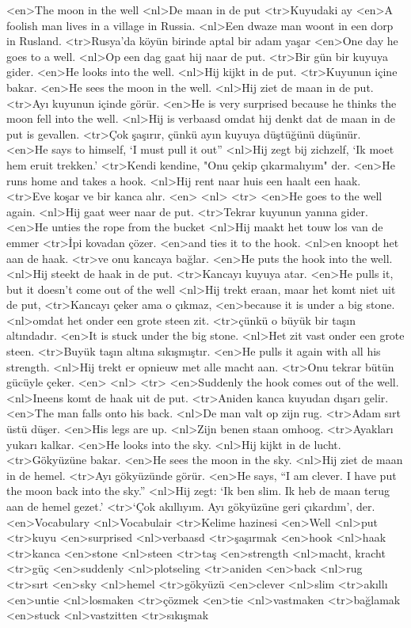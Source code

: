 <en>The moon in the well
<nl>De maan in de put
<tr>Kuyudaki ay
<en>A foolish man lives in a village in Russia.
<nl>Een dwaze man woont in een dorp in Rusland.
<tr>Rusya'da köyün birinde aptal bir adam yaşar
<en>One day he goes to a well.
<nl>Op een dag gaat hij naar de put.
<tr>Bir gün bir kuyuya gider.
<en>He looks into the well.
<nl>Hij kijkt in de put.
<tr>Kuyunun içine bakar.
<en>He sees the moon in the well.
<nl>Hij ziet de maan in de put.
<tr>Ayı kuyunun içinde görür.
<en>He is very surprised because he thinks the moon fell into the well.
<nl>Hij is verbaasd omdat hij denkt dat de maan in de put is gevallen.
<tr>Çok şaşırır, çünkü ayın kuyuya düştüğünü düşünür.
<en>He says to himself, `I must pull it out”
<nl>Hij zegt bij zichzelf, `Ik moet hem eruit trekken.'
<tr>Kendi kendine, "Onu çekip çıkarmalıyım" der.
<en>He runs home and takes a hook.
<nl>Hij rent naar huis een haalt een haak.
<tr>Eve koşar ve bir kanca alır.
<en>
<nl>
<tr>
<en>He goes to the well again.
<nl>Hij gaat weer naar de put.
<tr>Tekrar kuyunun yanına gider.
<en>He unties the rope from the bucket
<nl>Hij maakt het touw los van de emmer
<tr>İpi kovadan çözer.
<en>and ties it to the hook.
<nl>en knoopt het aan de haak. 
<tr>ve onu kancaya bağlar.
<en>He puts the hook into the well.
<nl>Hij steekt de haak in de put.
<tr>Kancayı kuyuya atar.
<en>He pulls it, but it doesn’t come out of the well
<nl>Hij trekt eraan, maar het komt niet uit de put,
<tr>Kancayı çeker ama o çıkmaz,
<en>because it is under a big stone.
<nl>omdat  het onder een grote steen zit.
<tr>çünkü o büyük bir taşın altındadır.
<en>It is stuck under the big stone.
<nl>Het zit vast onder een grote steen.
<tr>Buyük taşın altına sıkışmıştır.
<en>He pulls it again with all his strength.
<nl>Hij trekt er opnieuw met alle macht aan. 
<tr>Onu tekrar bütün gücüyle çeker.
<en>
<nl>
<tr>
<en>Suddenly the hook comes out of the well.
<nl>Ineens komt de haak uit de put.
<tr>Aniden kanca kuyudan dışarı gelir.
<en>The man falls onto his back.
<nl>De man valt op zijn rug.
<tr>Adam sırt üstü düşer.
<en>His legs are up.
<nl>Zijn benen staan omhoog. 
<tr>Ayakları yukarı kalkar.
<en>He looks into the sky.
<nl>Hij kijkt in de lucht.
<tr>Gökyüzüne bakar.
<en>He sees the moon in the sky.
<nl>Hij ziet de maan in de hemel.
<tr>Ayı gökyüzünde görür.
<en>He says, “I am clever. I have put the moon back into the sky.”
<nl>Hij zegt: `Ik ben slim. Ik heb de maan terug aan de hemel gezet.' 
<tr>`Çok akıllıyım. Ayı gökyüzüne geri çıkardım', der.
<en>Vocabulary
<nl>Vocabulair
<tr>Kelime hazinesi
<en>Well
<nl>put
<tr>kuyu
<en>surprised
<nl>verbaasd
<tr>şaşırmak
<en>hook
<nl>haak
<tr>kanca
<en>stone
<nl>steen
<tr>taş
<en>strength
<nl>macht, kracht
<tr>güç
<en>suddenly
<nl>plotseling
<tr>aniden
<en>back
<nl>rug
<tr>sırt
<en>sky
<nl>hemel
<tr>gökyüzü
<en>clever
<nl>slim
<tr>akıllı
<en>untie
<nl>losmaken
<tr>çözmek
<en>tie
<nl>vastmaken
<tr>bağlamak
<en>stuck
<nl>vastzitten
<tr>sıkışmak

